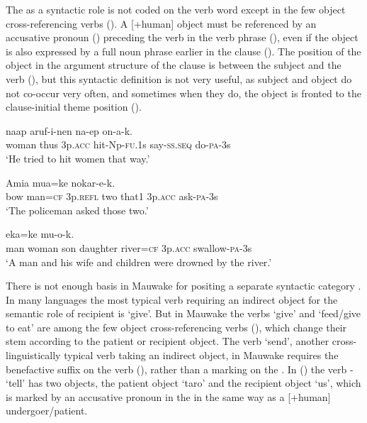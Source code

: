 The  as a syntactic role is not coded on the verb word except in the few object cross-referencing verbs (). A [+human] object must be referenced by an accusative pronoun () preceding the verb in the verb phrase (), even if the object is also expressed by a full noun phrase earlier in the clause (). The position of the object  in the argument structure of the clause is between the subject and the verb (), but this syntactic definition is not very useful, as subject and object do not co-occur very often, and sometimes when they do, the object is fronted to the clause-initial theme position (). 

\ea%
\label{ex:x923}
\gll {}  naap    aruf-i-nen  na-ep  on-a-k. \\
     woman  thus  3p.\textsc{acc}  hit-Np-\textsc{fu}.1s  say-\textsc{ss}.\textsc{seq}  do-\textsc{pa}-3s \\
\glt `He tried to hit women that way.'
\z

\ea%
\label{ex:x924}
\gll Amia  mua=ke       nokar-e-k. \\
     bow  man=\textsc{cf}  3p.\textsc{refl}  two  that1  3p.\textsc{acc}  ask-\textsc{pa}-3s \\
\glt `The policeman asked those two.'
\z

\ea%
\label{ex:x925}
\gll {}     eka=ke    mu-o-k. \\
     man  woman  son  daughter  river=\textsc{cf}  3p.\textsc{acc}  swallow-\textsc{pa}-3s \\
\glt `A man and his wife and children were drowned by the river.'
\z

There is not enough basis in Mauwake for positing a separate syntactic category . In many languages the most typical verb requiring an indirect object for the semantic role of recipient is `give'.  But in Mauwake the verbs `give' and `feed/give to eat' are among the few object cross-referencing verbs (), which change their stem according to the patient or recipient object. The verb `send', another cross-linguistically typical verb taking an indirect object, in Mauwake requires the benefactive suffix on the verb (), rather than a marking on the .  In () the verb - `tell' has two objects, the patient object  `taro' and the recipient object  `us', which is marked by an accusative pronoun in the  in the same way as a [+human] undergoer/patient. 


